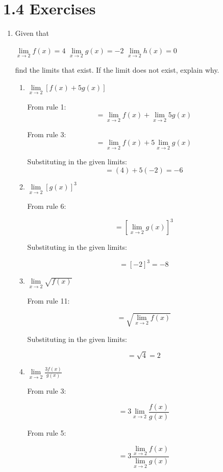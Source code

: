 \documentclass{article}
\begin{document}
	\section{1.4 Exercises}
	
	\begin{enumerate}
		\item Given that
		
		$\lim \limits _{x \to 2} f(x) = 4$ \hfill $\lim \limits _{x \to 2} g(x) = -2$ \hfill $\lim \limits _{x \to 2} h(x) = 0$
		
		find the limits that exist. If the limit does not exist, explain why.
		
		\begin{enumerate}
		
			\item $\lim \limits _{x \to 2} [ f(x) + 5g(x)]$
				
			From rule 1:
				$$ = \lim \limits _{x \to 2} f(x) + \lim \limits _{x \to 2} 5g(x)$$
				
			From rule 3:
				$$ = \lim \limits _{x \to 2} f(x) + 5\lim \limits _{x \to 2} g(x)$$

			Substituting in the given limits:
				$$ = (4) + 5(-2) = -6$$
				
		
			\item $\lim \limits _{x \to 2} [g(x)]^3$
			
			From rule 6:
			
				$$ = [\lim \limits _{x \to 2} g(x)]^3$$
				
			Substituting in the given limits:
			
				$$ = [-2]^3 = -8$$				
				
			\item $\lim \limits _{x \to 2} \sqrt{f(x)}$
			
			From rule 11:
				
			$$ = \sqrt{\lim \limits _{x \to 2} f(x)}$$
			
			Substituting in the given limits:
			
			$$ = \sqrt{4} = 2$$
			
			\item $\lim \limits _{x \to 2} \frac{3f(x)}{g(x)}$
			
				From rule 3:
			
				$$ = 3 \lim \limits _{x \to 2} \frac{f(x)}{g(x)}$$
				
				From rule 5:
				
				$$ = 3 \frac{\lim \limits _{x \to 2} f(x)}{\lim \limits _{x \to 2} g(x)}$$
				

\end{enumerate}
\end{enumerate}
\end{document}
